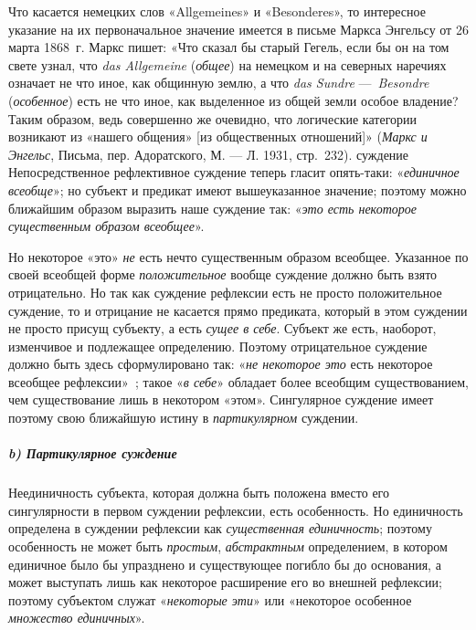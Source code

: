 \documentclass[twoside]{article}
\begin{document}
{{{{{Что касается немецких слов «Allgemeines» и «Besonderes», 
то интересное указание на их первоначальное значение
имеется в письме Маркса Энгельсу от 26 марта 1868~г. Маркс пишет: «Что
сказал бы старый Гегель, если бы он на том свете узнал, что
{\em das Allgemeine} ({\em общее})
на немецком и на северных наречиях означает не что иное, как
общинную землю, а что {\em das Sundre} —~}{\em Besondre}
({\em особенное})
есть не что иное, как выделенное из общей земли особое
владение? Таким образом, ведь совершенно же очевидно, что логические
категории возникают из «нашего общения» [из общественных отношений]»
({\em Маркс и Энгельс}, Письма, пер. Адоратского, М. — Л. 1931, стр.~232).} суждение}
\label{bkm:bm36}
Непосредственное рефлективное суждение теперь гласит
опять-таки: «{\em единичное всеобще}»;
но субъект и предикат имеют вышеуказанное значение; поэтому
можно ближайшим образом выразить наше суждение так:
«{\em это есть некоторое существенным
образом всеобщее}».

Но некоторое «это»
{\em не} есть нечто
существенным образом всеобщее. Указанное по своей всеобщей форме
{\em положительное}
вообще суждение должно быть взято отрицательно. Но так как
суждение рефлексии есть не просто положительное суждение, то и отрицание не
касается прямо предиката, который в этом суждении не просто присущ
субъекту, а есть {\em сущее в себе}.
Субъект же есть, наоборот, изменчивое и подлежащее
определению. Поэтому отрицательное суждение должно быть здесь
сформулировано так: «{\em не некоторое
это} есть некоторое всеобщее
рефлексии»~\label{bkm:bm37};
такое «{\em в себе}»
обладает более всеобщим существованием, чем существование
лишь в некотором «этом». Сингулярное суждение имеет поэтому свою ближайшую
истину в {\em партикулярном}
суждении.

\subparagraph[b) Партикулярное суждение]{b) Партикулярное суждение}
Неединичность субъекта, которая должна быть положена вместо
его сингулярности в первом суждении рефлексии, есть особенность. Но
единичность определена в суждении рефлексии как
{\em существенная единичность};
поэтому особенность не может быть
{\em простым},
{\em абстрактным}
определением, в котором единичное было бы упразднено и
существующее погибло бы до основания, а может выступать лишь как некоторое
расширение его во внешней рефлексии; поэтому субъектом служат
«{\em некоторые эти}» или
«некоторое особенное {\em множество
единичных}».

}}
\end{document}
